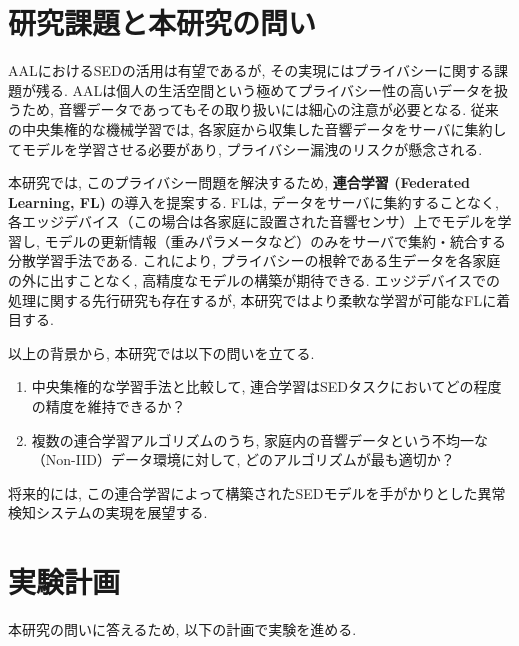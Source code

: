 \documentclass[dvipdfmx, twocolumn, 10pt]{bxjsarticle}
\begin{document}
\section{研究課題と本研究の問い}
AALにおけるSEDの活用は有望であるが, その実現にはプライバシーに関する課題が残る. 
AALは個人の生活空間という極めてプライバシー性の高いデータを扱うため, 音響データであってもその取り扱いには細心の注意が必要となる. 
従来の中央集権的な機械学習では, 各家庭から収集した音響データをサーバに集約してモデルを学習させる必要があり, プライバシー漏洩のリスクが懸念される.

本研究では, このプライバシー問題を解決するため, \textbf{連合学習 (Federated Learning, FL)} の導入を提案する. 
FLは, データをサーバに集約することなく, 各エッジデバイス（この場合は各家庭に設置された音響センサ）上でモデルを学習し, モデルの更新情報（重みパラメータなど）のみをサーバで集約・統合する分散学習手法である. 
これにより, プライバシーの根幹である生データを各家庭の外に出すことなく, 高精度なモデルの構築が期待できる. 
エッジデバイスでの処理に関する先行研究\cite{alsina2017homesound}も存在するが, 本研究ではより柔軟な学習が可能なFLに着目する.

以上の背景から, 本研究では以下の問いを立てる.
\begin{enumerate}
    \item 中央集権的な学習手法と比較して, 連合学習はSEDタスクにおいてどの程度の精度を維持できるか？
    \item 複数の連合学習アルゴリズムのうち, 家庭内の音響データという不均一な（Non-IID）データ環境に対して, どのアルゴリズムが最も適切か？
\end{enumerate}
将来的には, この連合学習によって構築されたSEDモデルを手がかりとした異常検知システムの実現を展望する.

\section{実験計画}
本研究の問いに答えるため, 以下の計画で実験を進める.
\end{document}
